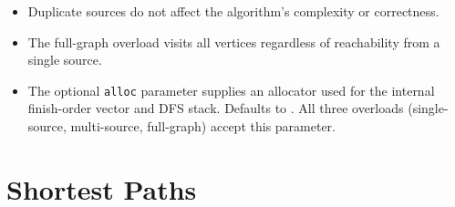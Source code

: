 \begin{itemdescr}
      \pnum\remarks
            \begin{itemize}
                  \item Duplicate sources do not affect the algorithm's complexity or correctness.
                  \item The full-graph overload visits all vertices regardless of reachability from a single source.
                  \item The optional \lstinline{alloc} parameter supplies an allocator used for
                        the internal finish-order vector and DFS stack.  Defaults to
                        .  All three overloads (single-source,
                        multi-source, full-graph) accept this parameter.
            \end{itemize}
\end{itemdescr}



\section{Shortest Paths}

